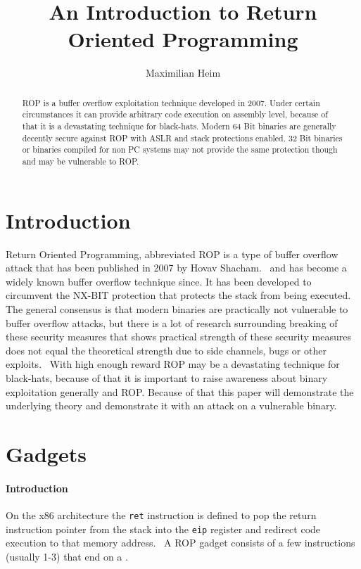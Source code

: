 \documentclass[journal=tosc,submission, notanonymous]{iacrtrans}
\author{Maximilian Heim\inst{1}}
\institute{
  University Albstadt-Sigmaringen, Albstadt, Germany, \email{MaximilianHeim@protonmail.com}
}
\title{An Introduction to Return Oriented Programming}
\begin{document}
\maketitle




\begin{abstract}
ROP is a buffer overflow exploitation technique developed in 2007. Under certain circumstances it can provide arbitrary code execution on assembly level, because of that it is a devastating technique for black-hats. Modern 64 Bit binaries are generally decently secure against ROP with ASLR and stack protections enabled. 32 Bit binaries or binaries compiled for non PC systems may not provide the same protection though and may be vulnerable to ROP. 
\end{abstract}

\section{Introduction}
Return Oriented Programming, abbreviated ROP is a type of buffer overflow attack that has been published in 2007 by Hovav Shacham.~\cite{ropfirstpaper} and has become a widely known buffer overflow technique since. It has been developed to circumvent the NX-BIT protection that protects the stack from being executed. The general consensus is that modern binaries are practically not vulnerable to buffer overflow attacks, but there is a lot of research surrounding breaking of these security measures that shows practical strength of these security measures does not equal the theoretical strength due to side channels, bugs or other exploits.~\cite{aslr} With high enough reward ROP may be a devastating technique for black-hats, because of that it is important to raise awareness about binary exploitation generally and ROP. Because of that this paper will demonstrate the underlying theory and demonstrate it with an attack on a vulnerable binary.


\section{Gadgets}
\label{sec:gadgets}
\paragraph{Introduction}
On the x86 architecture the \Verb+ret+ instruction is defined to pop the return instruction pointer from the stack into the \Verb+eip+ register and redirect code execution to that memory address.~\cite{retx86} A ROP gadget consists of a few instructions (usually 1-3) that end on a .
\end{document}
